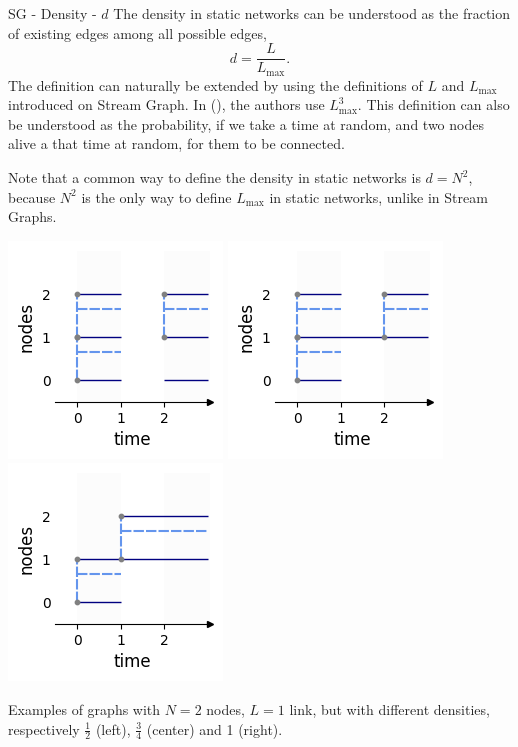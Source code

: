 \documentclass[a4paper,11pt]{book}
\begin{document}
\begin{textbox}{SG - Density - $d$}
The density in static networks can be understood as the fraction of existing edges among all possible edges,
\[
d=\frac{L}{L_{\max}}. 
\]
The definition can naturally be extended by using the definitions of $L$ and $L_{\max}$ introduced on Stream Graph. In (\cite{latapy2018stream}), the authors use ${L_{\max}^3}$. This definition can also be understood as the probability, if we take a time at random, and two nodes alive a that time at random, for them to be connected.

Note that a common way to define the density in static networks is $d=N^2$, because $N^2$ is the only way to define $L_{\max}$ in static networks, unlike in Stream Graphs. 

\centering
\vspace{0.3cm}


\includegraphics[width=0.3\linewidth]{pics/dynamic/d1.png}
\includegraphics[width=0.3\linewidth]{pics/dynamic/d2.png}
\includegraphics[width=0.3\linewidth]{pics/dynamic/d3.png}

Examples of graphs with $N=2$ nodes, $L=1$ link, but with different densities, respectively $\frac{1}{2}$ (left), $\frac{3}{4}$ (center) and 1 (right).


\end{textbox}
\end{document}
